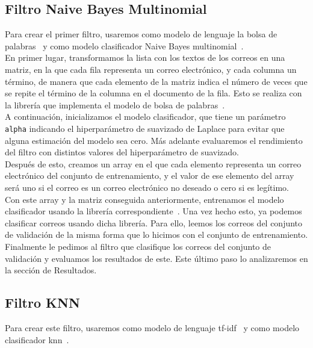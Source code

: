 \documentclass[conference,a4paper]{IEEEtran}
\begin{document}
\subsection{Filtro Naive Bayes Multinomial}
Para crear el primer filtro, usaremos como modelo de lenguaje la bolsa de palabras~\cite{b11} y como modelo clasificador Naive Bayes multinomial~\cite{b12}. \\

En primer lugar, transformamos la lista con los textos de los correos en una matriz, en la que cada fila representa un correo electrónico, y cada columna un término, de manera que cada elemento de la matriz indica el número de veces que se repite el término de la columna en el documento de la fila. Esto se realiza con la librería que implementa el modelo de bolsa de palabras~\cite{b11}. \\

A continuación, inicializamos el modelo clasificador, que tiene un parámetro \texttt{alpha} indicando el hiperparámetro de suavizado de Laplace para evitar que alguna estimación del modelo sea cero. Más adelante evaluaremos el rendimiento del filtro con distintos valores del hiperparámetro de suavizado. \\

Después de esto, creamos un array en el que cada elemento representa un correo electrónico del conjunto de entrenamiento, y el valor de ese elemento del array será uno si el correo es un correo electrónico no deseado o cero si es legítimo. \\

Con este array y la matriz conseguida anteriormente, entrenamos el modelo clasificador usando la librería correspondiente~\cite{b12}. Una vez hecho esto, ya podemos clasificar correos usando dicha librería. Para ello, leemos los correos del conjunto de validación de la misma forma que lo hicimos con el conjunto de entrenamiento. \\

Finalmente le pedimos al filtro que clasifique los correos del conjunto de validación y evaluamos los resultados de este. Este último paso lo analizaremos en la sección de Resultados. \\

\subsection{Filtro KNN}
Para crear este filtro, usaremos como modelo de lenguaje tf-idf~\cite{b13} y como modelo clasificador knn~\cite{b14}. \\
\end{document}
